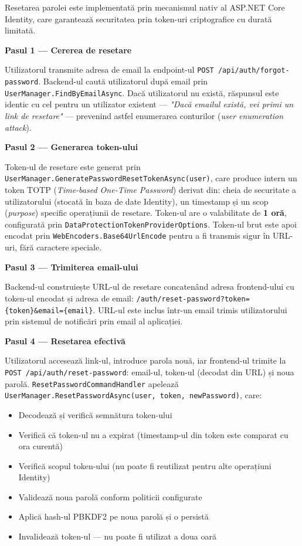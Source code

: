 \documentclass[12pt, a4paper]{report}
\begin{document}
Resetarea parolei este implementată prin mecanismul nativ al ASP.NET Core Identity,
care garantează securitatea prin token-uri criptografice cu durată limitată.

\textbf{Pasul 1 --- Cererea de resetare}

Utilizatorul transmite adresa de email la endpoint-ul
\texttt{POST /api/auth/forgot-password}. Backend-ul caută utilizatorul după email
prin \texttt{UserManager.FindByEmailAsync}. Dacă utilizatorul nu există, răspunsul
este identic cu cel pentru un utilizator existent --- \textit{"Dacă emailul există,
vei primi un link de resetare"} --- prevenind astfel enumerarea conturilor
(\textit{user enumeration attack}).

\textbf{Pasul 2 --- Generarea token-ului}

Token-ul de resetare este generat prin
\texttt{UserManager.GeneratePasswordResetTokenAsync(user)}, care produce intern un
token TOTP (\textit{Time-based One-Time Password}) derivat din: cheia de securitate
a utilizatorului (stocată în baza de date Identity), un timestamp și un scop
(\textit{purpose}) specific operațiunii de resetare. Token-ul are o valabilitate
de \textbf{1 oră}, configurată prin \texttt{DataProtectionTokenProviderOptions}.
Token-ul brut este apoi encodat prin \texttt{WebEncoders.Base64UrlEncode} pentru
a fi transmis sigur în URL-uri, fără caractere speciale.

\textbf{Pasul 3 --- Trimiterea email-ului}

Backend-ul construiește URL-ul de resetare concatenând adresa frontend-ului cu
token-ul encodat și adresa de email:
\texttt{/auth/reset-password?token=\{token\}\&email=\{email\}}.
URL-ul este inclus într-un email trimis utilizatorului prin sistemul de notificări
prin email al aplicației.


\textbf{Pasul 4 --- Resetarea efectivă}

Utilizatorul accesează link-ul, introduce parola nouă, iar frontend-ul trimite
la \texttt{POST /api/auth/reset-password}: email-ul, token-ul (decodat din URL)
și noua parolă. \texttt{ResetPasswordCommandHandler} apelează
\texttt{UserManager.ResetPasswordAsync(user, token, newPassword)}, care:

\begin{itemize}
    \item Decodează și verifică semnătura token-ului
    \item Verifică că token-ul nu a expirat (timestamp-ul din token este comparat
          cu ora curentă)
    \item Verifică scopul token-ului (nu poate fi reutilizat pentru alte operațiuni
          Identity)
    \item Validează noua parolă conform politicii configurate
    \item Aplică hash-ul PBKDF2 pe noua parolă și o persistă
    \item Invalidează token-ul --- nu poate fi utilizat a doua oară
\end{itemize}
\end{document}
